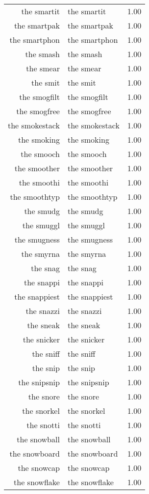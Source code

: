 \begin{table}[ht]
\begin{tabular}{rlr}
  the smartit & the smartit & 1.00 \\ 
  the smartpak & the smartpak & 1.00 \\ 
  the smartphon & the smartphon & 1.00 \\ 
  the smash & the smash & 1.00 \\ 
  the smear & the smear & 1.00 \\ 
  the smit & the smit & 1.00 \\ 
  the smogfilt & the smogfilt & 1.00 \\ 
  the smogfree & the smogfree & 1.00 \\ 
  the smokestack & the smokestack & 1.00 \\ 
  the smoking & the smoking & 1.00 \\ 
  the smooch & the smooch & 1.00 \\ 
  the smoother & the smoother & 1.00 \\ 
  the smoothi & the smoothi & 1.00 \\ 
  the smoothtyp & the smoothtyp & 1.00 \\ 
  the smudg & the smudg & 1.00 \\ 
  the smuggl & the smuggl & 1.00 \\ 
  the smugness & the smugness & 1.00 \\ 
  the smyrna & the smyrna & 1.00 \\ 
  the snag & the snag & 1.00 \\ 
  the snappi & the snappi & 1.00 \\ 
  the snappiest & the snappiest & 1.00 \\ 
  the snazzi & the snazzi & 1.00 \\ 
  the sneak & the sneak & 1.00 \\ 
  the snicker & the snicker & 1.00 \\ 
  the sniff & the sniff & 1.00 \\ 
  the snip & the snip & 1.00 \\ 
  the snipsnip & the snipsnip & 1.00 \\ 
  the snore & the snore & 1.00 \\ 
  the snorkel & the snorkel & 1.00 \\ 
  the snotti & the snotti & 1.00 \\ 
  the snowball & the snowball & 1.00 \\ 
  the snowboard & the snowboard & 1.00 \\ 
  the snowcap & the snowcap & 1.00 \\ 
  the snowflake & the snowflake & 1.00 \\ 

\end{tabular}
\end{table}
